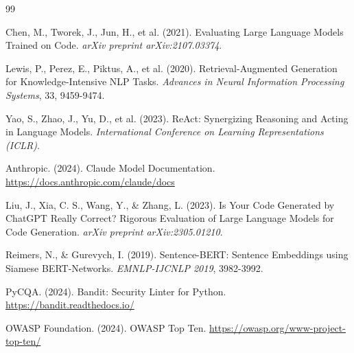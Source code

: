 \documentclass[12pt,a4paper]{article}
\begin{document}
\begin{thebibliography}{99}

Chen, M., Tworek, J., Jun, H., et al. (2021). Evaluating Large Language Models Trained on Code. \textit{arXiv preprint arXiv:2107.03374}.

Lewis, P., Perez, E., Piktus, A., et al. (2020). Retrieval-Augmented Generation for Knowledge-Intensive NLP Tasks. \textit{Advances in Neural Information Processing Systems}, 33, 9459-9474.

Yao, S., Zhao, J., Yu, D., et al. (2023). ReAct: Synergizing Reasoning and Acting in Language Models. \textit{International Conference on Learning Representations (ICLR)}.

Anthropic. (2024). Claude Model Documentation. \url{https://docs.anthropic.com/claude/docs}

Liu, J., Xia, C. S., Wang, Y., \& Zhang, L. (2023). Is Your Code Generated by ChatGPT Really Correct? Rigorous Evaluation of Large Language Models for Code Generation. \textit{arXiv preprint arXiv:2305.01210}.

Reimers, N., \& Gurevych, I. (2019). Sentence-BERT: Sentence Embeddings using Siamese BERT-Networks. \textit{EMNLP-IJCNLP 2019}, 3982-3992.

PyCQA. (2024). Bandit: Security Linter for Python. \url{https://bandit.readthedocs.io/}

OWASP Foundation. (2024). OWASP Top Ten. \url{https://owasp.org/www-project-top-ten/}

\end{thebibliography}
\end{document}
